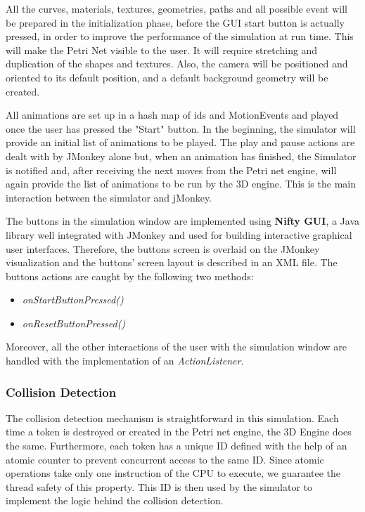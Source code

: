 All the curves, materials, textures, geometries, paths and all possible event will be prepared in the initialization phase, before the GUI start button is actually pressed, in order to improve the performance of the simulation at run time. 
This will make the Petri Net visible to the user. It will require stretching and duplication of the shapes and textures. Also, the camera will be positioned and oriented to its default position, and a default background geometry will be created.

All animations are set up in a hash map of ids and MotionEvents and played once the user has pressed the "Start" button. 
In the beginning, the simulator will provide an initial list of animations to be played. The play and pause actions are dealt with by JMonkey alone but, when an animation has finished, the Simulator is notified and, after receiving the next moves from the Petri net engine, will again provide the list of animations to be run by the 3D engine. 
This is the main interaction between the simulator and jMonkey. 

The buttons in the simulation window are implemented using \textbf{Nifty GUI}, a Java library well integrated with JMonkey and used for building interactive graphical user interfaces. Therefore, the buttons screen is overlaid on the JMonkey visualization and the buttons' screen layout is described in an XML file. The buttons actions are caught by the following two methods: 
\begin{itemize}
\item \textit{onStartButtonPressed()}
\item \textit{onResetButtonPressed()}
\end{itemize}
Moreover, all the other interactions of the user with the simulation window are handled with the implementation of an \textit{ActionListener}. 


\subsubsection{Collision Detection}

The collision detection mechanism is straightforward in this simulation. Each time a token is destroyed or created in the Petri net engine, the 3D Engine does the same. Furthermore, each token has a unique ID defined with the help of an atomic counter to prevent concurrent access to the same ID. Since atomic operations take only one instruction of the CPU to execute, we guarantee the thread safety of this property.
This ID is then used by the simulator to implement the logic behind the collision detection.

